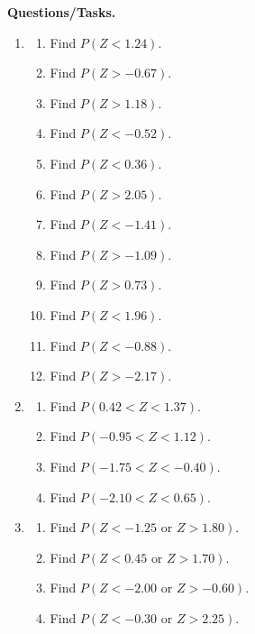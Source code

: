 	\textbf{Questions/Tasks.}
	\begin{enumerate}[label=\textbf{\arabic*)}]
		\item {}
		\begin{enumerate}[label=\textbf{\alph*)}]
			\item Find \(P(Z<1.24)\).
			\item Find \(P(Z>-0.67)\).
			\item Find \(P(Z>1.18)\).
			\item Find \(P(Z<-0.52)\).
			\item Find \(P(Z<0.36)\).
			\item Find \(P(Z>2.05)\).
			\item Find \(P(Z<-1.41)\).
			\item Find \(P(Z>-1.09)\).
			\item Find \(P(Z>0.73)\).
			\item Find \(P(Z<1.96)\).
			\item Find \(P(Z<-0.88)\).
			\item Find \(P(Z>-2.17)\).
		\end{enumerate}
		
		\item {}
		\begin{enumerate}[label=\textbf{\alph*)}]
			\item Find \(P(0.42<Z<1.37)\).
			\item Find \(P(-0.95<Z<1.12)\).
			\item Find \(P(-1.75<Z<-0.40)\).
			\item Find \(P(-2.10<Z<0.65)\).
		\end{enumerate}
		
		\item {}
		\begin{enumerate}[label=\textbf{\alph*)}]
			\item Find \(P(Z<-1.25\text{ or }Z>1.80)\).
			\item Find \(P(Z<0.45\text{ or }Z>1.70)\).
			\item Find \(P(Z<-2.00\text{ or }Z>-0.60)\).
			\item Find \(P(Z<-0.30\text{ or }Z>2.25)\).
		\end{enumerate}
	\end{enumerate}
	
